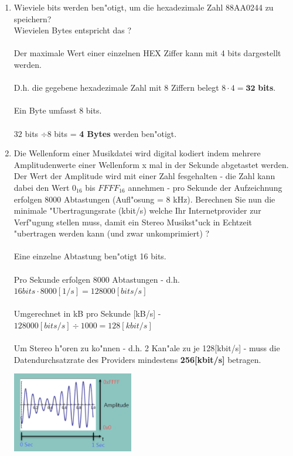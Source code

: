\documentclass[a4paper,10pt]{article}
\begin{document}
\begin{enumerate}
\item Wieviele bits werden ben"otigt, um die hexadezimale Zahl 88AA0244 zu speichern? \\
Wievielen Bytes entspricht das ? \\ \\ %
	 {\color{ForestGreen}
	      Der maximale Wert einer einzelnen HEX Ziffer kann mit 4 bits dargestellt werden. \\ \\
		 D.h. die gegebene hexadezimale Zahl mit 8 Ziffern belegt $8 \cdot 4 = \mathbf{32}$ \textbf{bits}. \\ \\ 
		 Ein Byte umfasst 8 bits. \\ \\
		 $32$ bits $\div 8$ bits = \textbf{4 Bytes} werden ben"otigt. \\
	 }

\item Die Wellenform einer Musikdatei wird digital kodiert indem mehrere Amplitudenwerte einer Wellenform x mal in der Sekunde abgetastet werden. Der Wert der Amplitude wird mit einer Zahl fesgehalten - die Zahl kann dabei den Wert $0_{16}$ bis $FFFF_{16}$ annehmen - pro Sekunde der Aufzeichnung erfolgen 8000 Abtastungen (Aufl"osung = 8 kHz). Berechnen Sie nun die minimale "Ubertragungsrate (kbit/s) welche Ihr Internetprovider zur Verf"ugung stellen muss, damit ein Stereo Musikst"uck in Echtzeit "ubertragen werden kann (und zwar unkomprimiert) ? \\ \\
	 {\color{ForestGreen}
	      Eine einzelne Abtastung ben"otigt 16 bits. \\ \\
	      Pro Sekunde erfolgen 8000 Abtastungen - d.h. $16 bits \cdot 8000 [1/s] = 128000 [bits/s]$ \\ \\
	      Umgerechnet in kB pro Sekunde [kB/s] - $128000[bits/s] \div 1000 = 128[kbit/s]$ \\ \\
	      Um Stereo h"oren zu ko"nnen - d.h. 2 Kan"ale zu je 128[kbit/s] - muss die Datendurchsatzrate des Providers mindestens \textbf{256[kbit/s]} betragen.\\
	 }
	 
\vspace{3mm}

\begin{center}
\includegraphics[width=150pt]{Wave.png}
\end{center}

\end{enumerate}
\end{document}
